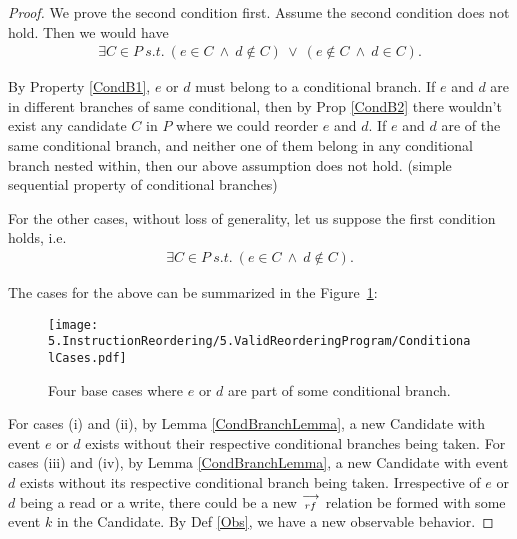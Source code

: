         \begin{proof}

            We prove the second condition first. 
            Assume the second condition does not hold. 
            Then we would have
            \begin{align*}
                \exists C \in P \ s.t. \ 
                (e \in C \ \wedge \ d \notin C) \ \vee \ 
                (e \notin C \ \wedge \ d \in C).
            \end{align*}
            
            By Property \ref{CondB1}, $e$ or $d$ must belong to a conditional branch. 
            If $e$ and $d$ are in different branches of same conditional, then by Prop \ref{CondB2} there wouldn't exist any candidate $C$ in $P$ where we could reorder $e$ and $d$. 
            If $e$ and $d$ are of the same conditional branch, and neither one of them belong in any conditional branch nested within, then our above assumption does not hold. (simple sequential property of conditional branches)
            
            For the other cases, without loss of generality, let us suppose the first condition holds, i.e. 
            \begin{align*}
                \exists C \in P \ s.t. \ 
                (e \in C \ \wedge \ d \notin C).
            \end{align*}

            The cases for the above can be summarized in the Figure~\ref{reord:cond_branch_cases}: 
            \begin{figure}[H]
                \label{CondCases}
                \centering 
                \texttt{[image: 5.InstructionReordering/5.ValidReorderingProgram/ConditionalCases.pdf]}
                \caption{Four base cases where $e$ or $d$ are part of some conditional branch.}
                \label{reord:cond_branch_cases}
            \end{figure}

            For cases (i) and (ii), by Lemma \ref{CondBranchLemma}, a new Candidate with event $e$ or $d$ exists without their respective conditional branches being taken.
            For cases (iii) and (iv), by Lemma \ref{CondBranchLemma}, a new Candidate with event $d$ exists without its respective conditional branch being taken.
            Irrespective of $e$ or $d$ being a read or a write, there could be a new $\stackrel{\longrightarrow}{_{rf}}$ relation be formed with some event $k$ in the Candidate. By Def \ref{Obs}, we have a new observable behavior\footnotemark. 


\end{proof}
